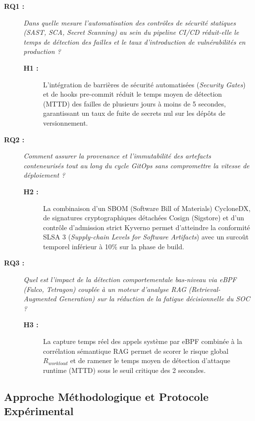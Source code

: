 \begin{description}
    \item[\textbf{RQ1 :}] \textit{Dans quelle mesure l'automatisation des contrôles de sécurité statiques (SAST, SCA, Secret Scanning) au sein du pipeline CI/CD réduit-elle le temps de détection des failles et le taux d'introduction de vulnérabilités en production ?}
    \begin{description}
        \item[\textbf{H1 :}] L'intégration de barrières de sécurité automatisées (\textit{Security Gates}) et de hooks pre-commit réduit le temps moyen de détection (MTTD) des failles de plusieurs jours à moins de 5 secondes, garantissant un taux de fuite de secrets nul sur les dépôts de versionnement.
    \end{description}

    \item[\textbf{RQ2 :}] \textit{Comment assurer la provenance et l'immutabilité des artefacts conteneurisés tout au long du cycle GitOps sans compromettre la vitesse de déploiement ?}
    \begin{description}
        \item[\textbf{H2 :}] La combinaison d'un SBOM (Software Bill of Materials) CycloneDX, de signatures cryptographiques détachées Cosign (Sigstore) et d'un contrôle d'admission strict Kyverno permet d'atteindre la conformité SLSA 3 (\textit{Supply-chain Levels for Software Artifacts}) avec un surcoût temporel inférieur à 10\% sur la phase de build.
    \end{description}

    \item[\textbf{RQ3 :}] \textit{Quel est l'impact de la détection comportementale bas-niveau via eBPF (Falco, Tetragon) couplée à un moteur d'analyse RAG (Retrieval-Augmented Generation) sur la réduction de la fatigue décisionnelle du SOC ?}
    \begin{description}
        \item[\textbf{H3 :}] La capture temps réel des appels système par eBPF combinée à la corrélation sémantique RAG permet de scorer le risque global $R_{workload}$ et de ramener le temps moyen de détection d'attaque runtime (MTTD) sous le seuil critique des 2 secondes.
    \end{description}
\end{description}

\subsection{Approche Méthodologique et Protocole Expérimental}
\label{subsec:protocole_experimental}

